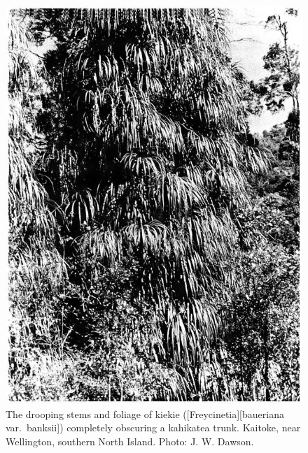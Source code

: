 \begin{figure}[htb]
	\centering
	\begin{minipage}[t]{0.502\textwidth}
		\centering
		\includegraphics[width=\textwidth]{graphics/figure32kiekie.jpg}
    	\caption[The drooping stems and foliage of kiekie]{The drooping stems and foliage of kiekie ([Freycinetia][baueriana var.\ banksii]) completely obscuring a kahikatea trunk. Kaitoke, near Wellington, southern North Island. Photo: J. W. Dawson.}%
    	\label{fig:32kiekie}
	\end{minipage}\hfill%
	\begin{minipage}[t]{0.478\textwidth}
    	\centering

\end{minipage}
\end{figure}
